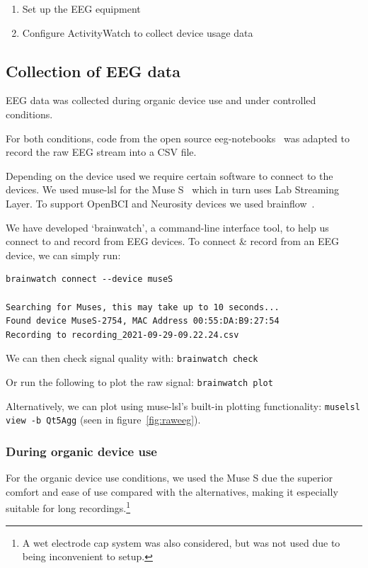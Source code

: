 \begin{enumerate}
    \item Set up the EEG equipment
    \item Configure ActivityWatch to collect device usage data
\end{enumerate}

    \subsection{Collection of EEG data}

        EEG data was collected during organic device use and under controlled conditions.

        For both conditions, code from the open source eeg-notebooks~\cite{barachant_eeg-notebooks_2020} was adapted to record the raw EEG stream into a CSV file.

        Depending on the device used we require certain software to connect to the devices. We used muse-lsl for the Muse S~\cite{muse-lsl} which in turn uses Lab Streaming Layer. To support OpenBCI and Neurosity devices we used brainflow~\cite{noauthor_brainflow_2020}.

        We have developed `brainwatch', a command-line interface tool, to help us connect to and record from EEG devices. To connect \& record from an EEG device, we can simply run:

\begin{verbatim}
brainwatch connect --device museS

Searching for Muses, this may take up to 10 seconds...
Found device MuseS-2754, MAC Address 00:55:DA:B9:27:54
Recording to recording_2021-09-29-09.22.24.csv
\end{verbatim}

        We can then check signal quality with: \texttt{brainwatch check}

        Or run the following to plot the raw signal: \texttt{brainwatch plot}

        Alternatively, we can plot using muse-lsl's built-in plotting functionality: \texttt{muselsl view -b Qt5Agg} (seen in figure~\ref{fig:raweeg}).

        \subsubsection*{During organic device use}

            For the organic device use conditions, we used the Muse S due the superior comfort and ease of use compared with the alternatives, making it especially suitable for long recordings.\footnote{A wet electrode cap system was also considered, but was not used due to being inconvenient to setup.}

